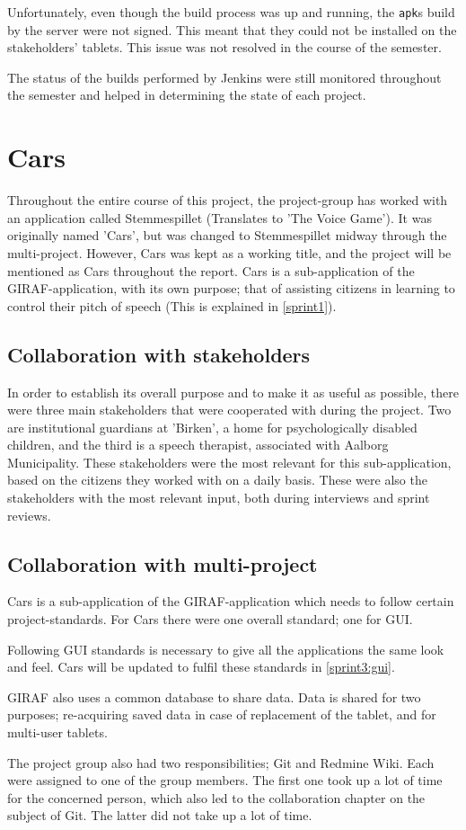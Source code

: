 Unfortunately, even though the build process was up and running, the \texttt{apk}s build by the server were not signed.
This meant that they could not be installed on the stakeholders' tablets.
This issue was not resolved in the course of the semester.

The status of the builds performed by Jenkins were still monitored throughout the semester and helped in determining the state of each project.

\section{Cars}
Throughout the entire course of this project, the project-group has worked with an application called Stemmespillet (Translates to 'The Voice Game').
It was originally named 'Cars', but was changed to Stemmespillet midway through the multi-project.
However, Cars was kept as a working title, and the project will be mentioned as Cars throughout the report.
Cars is a sub-application of the GIRAF-application, with its own purpose; that of assisting citizens in learning to control their pitch of speech (This is explained in \cref{sprint1}).

\subsection{Collaboration with stakeholders}
In order to establish its overall purpose and to make it as useful as possible, there were three main stakeholders that were cooperated with during the project.
Two are institutional guardians at 'Birken', a home for psychologically disabled children, and the third is a speech therapist, associated with Aalborg Municipality.
These stakeholders were the most relevant for this sub-application, based on the citizens they worked with on a daily basis.
These were also the stakeholders with the most relevant input, both during interviews and sprint reviews.

\subsection{Collaboration with multi-project}
Cars is a sub-application of the GIRAF-application which needs to follow certain project-standards.
For Cars there were one overall standard; one for GUI.

Following GUI standards is necessary to give all the applications the same look and feel.
Cars will be updated to fulfil these standards in \cref{sprint3:gui}.

GIRAF also uses a common database to share data.
Data is shared for two purposes; re-acquiring saved data in case of replacement of the tablet, and for multi-user tablets.

The project group also had two responsibilities; Git and Redmine Wiki.
Each were assigned to one of the group members.
The first one took up a lot of time for the concerned person, which also led to the collaboration chapter on the subject of Git.
The latter did not take up a lot of time.
